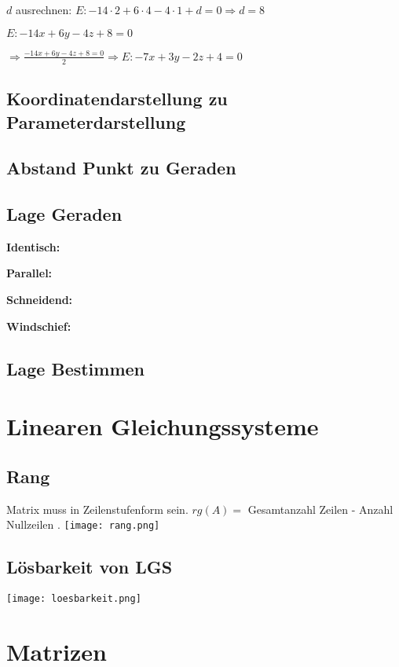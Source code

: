 \begin{multicols*}{3}
     $d$ ausrechnen: $ E: -14 \cdot 2  + 6 \cdot 4 - 4\cdot 1 + d = 0 \Rightarrow d = 8$

     $E: -14x + 6y - 4z + 8 = 0$

    $\Rightarrow \frac{-14x + 6y - 4z + 8 = 0}{2} \Rightarrow E: -7x + 3y - 2z + 4 = 0$

    \subsection{Koordinatendarstellung zu Parameterdarstellung }


    \subsection{Abstand Punkt zu Geraden}

    \subsection{Lage Geraden}

    \textbf{Identisch:}

    \textbf{Parallel:}

    \textbf{Schneidend:}

    \textbf{Windschief:}

    \subsection{Lage Bestimmen}

    \section{Linearen Gleichungssysteme}
    \subsection{Rang}
    {Matrix muss in Zeilenstufenform sein.}
    {$rg(A) = $ Gesamtanzahl Zeilen - Anzahl Nullzeilen .}
    \texttt{[image: rang.png]}

    \subsection{Lösbarkeit von LGS}

    \texttt{[image: loesbarkeit.png]}

    \section{Matrizen}

\end{multicols*}
